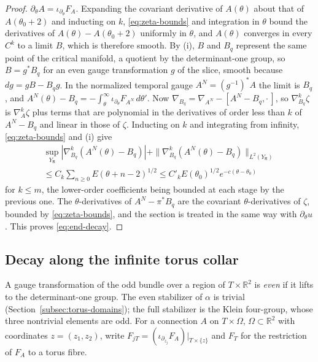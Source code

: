 \documentclass[11pt]{amsart}
\theoremstyle{definition}
\theoremstyle{remark}
\theoremstyle{plain}
\numberwithin{equation}{section}
\newcommand{\RR}{\mathbb{R}}
\begin{document}
\begin{proof}
$\partial_\theta A=\iota_{\partial_\theta}F_A$. Expanding the covariant derivative of $A(\theta)$ about that of
$A(\theta_0+2)$ and inducting on $k$, \eqref{eq:zeta-bounds} and integration in $\theta$ bound the
derivatives of $A(\theta)-A(\theta_0+2)$ uniformly in $\theta$, and $A(\theta)$ converges in every
$C^k$ to a limit $B$, which is therefore smooth. By (i), $B$ and $B_q$ represent the same
point of the critical manifold, a quotient by the determinant-one group, so $B=g^*B_q$ for an
even gauge transformation $g$ of the slice, smooth because $dg=gB-B_qg$. In the normalized
temporal gauge $A^N=(g^{-1})^*A$ the limit is $B_q$, and
$A^N(\theta)-B_q=-\int_\theta^\infty\iota_{\partial_\theta}F_{A^N}\,d\theta'$. Now
$\nabla_{B_q}=\nabla_{A^N}-[A^N-B_q,\cdot\,]$, so $\nabla^k_{B_q}\zeta$ is $\nabla^k_A\zeta$ plus terms that are
polynomial in the derivatives of order less than $k$ of $A^N-B_q$ and linear in those of $\zeta$. Inducting on $k$ and
integrating from infinity, \eqref{eq:zeta-bounds} and (i) give
\begin{multline*}
\sup_{Y_\mathsf R}|\nabla^k_{B_q}(A^N(\theta)-B_q)|+\|\nabla^k_{B_q}(A^N(\theta)-B_q)\|_{L^2(Y_\mathsf R)}\\
\le C_k\sum_{n\ge0}E(\theta+n-2)^{1/2}\le C'_kE(\theta_0)^{1/2}e^{-c(\theta-\theta_0)}
\end{multline*}
for $k\le m$, the lower-order coefficients being bounded at each stage by the previous
one. The $\theta$-derivatives of $A^N-\pi^*B_q$ are the covariant $\theta$-derivatives of $\zeta$,
bounded by \eqref{eq:zeta-bounds}, and the section is treated in the same way with
$\partial_\theta u$. This proves \eqref{eq:end-decay}.
\end{proof}

\subsection{Decay along the infinite torus collar}\label{subsec:torus-slice}

A gauge transformation of the odd bundle over a region of $T\times\RR^2$ is
\emph{even} if it lifts to the determinant-one group. The even stabilizer of
$\alpha$ is trivial (Section~\ref{subsec:torus-domains}); the full stabilizer is
the Klein four-group, whose three nontrivial elements are odd.
For a connection $A$ on $T\times\Omega$, $\Omega\subset\RR^2$ with coordinates
$z=(z_1,z_2)$, write $F_{jT}=(\iota_{\partial_{z_j}}F_A)|_{T\times\{z\}}$ and $F_T$ for the
restriction of $F_A$ to a torus fibre.
\end{document}
